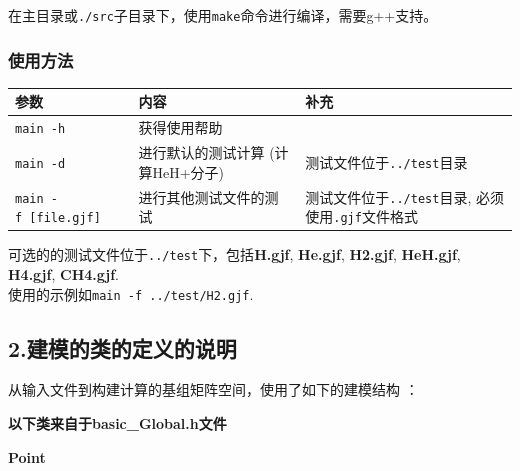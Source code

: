 \documentclass[11pt]{article}
\begin{document}
在主目录或\texttt{./src}子目录下，使用\texttt{make}命令进行编译，需要g++支持。

\subsubsection{使用方法}\label{ux4f7fux7528ux65b9ux6cd5}

\begin{longtable}[]{@{}lll@{}}
\toprule
参数 & 内容 & 补充\tabularnewline
\midrule
\endhead
\texttt{main\ -h} & 获得使用帮助 &\tabularnewline
\texttt{main\ -d} & 进行默认的测试计算 (计算HeH+分子) &
测试文件位于\texttt{../test}目录\tabularnewline
\texttt{main\ -f\ {[}file.gjf{]}} & 进行其他测试文件的测试 &
测试文件位于\texttt{../test}目录,
必须使用\texttt{.gjf}文件格式\tabularnewline
\bottomrule
\end{longtable}

可选的的测试文件位于\texttt{../test}下，包括\textbf{H.gjf},
\textbf{He.gjf}, \textbf{H2.gjf}, \textbf{HeH.gjf}, \textbf{H4.gjf},
\textbf{CH4.gjf}.\\
使用的示例如\texttt{main\ -f\ ../test/H2.gjf}.

    \subsection{2.建模的类的定义的说明}\label{ux5efaux6a21ux7684ux7c7bux7684ux5b9aux4e49ux7684ux8bf4ux660e}

从输入文件到构建计算的基组矩阵空间，使用了如下的建模结构 ：

\textbf{以下类来自于basic\_Global.h文件}

\textbf{Point}
\end{document}

